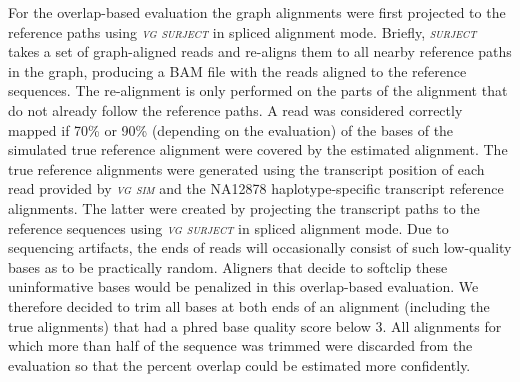 \documentclass[11pt]{ucthesis}
\newcommand{\tool}[1]{\emph{\textsc{#1}}}
\begin{document}
For the overlap-based evaluation the graph alignments were first projected to the reference paths using \tool{vg surject} in spliced alignment mode. Briefly, \tool{surject} takes a set of graph-aligned reads and re-aligns them to all nearby reference paths in the graph, producing a BAM file with the reads aligned to the reference sequences. The re-alignment is only performed on the parts of the alignment that do not already follow the reference paths. A read was considered correctly mapped if 70\% or 90\% (depending on the evaluation) of the bases of the simulated true reference alignment were covered by the estimated alignment. The true reference alignments were generated using the transcript position of each read provided by \tool{vg sim} and the NA12878 haplotype-specific transcript reference alignments. The latter were created by projecting the transcript paths to the reference sequences using \tool{vg surject} in spliced alignment mode. Due to sequencing artifacts, the ends of reads will occasionally consist of such low-quality bases as to be practically random. Aligners that decide to softclip these uninformative bases would be penalized in this overlap-based evaluation. We therefore decided to trim all bases at both ends of an alignment (including the true alignments) that had a phred base quality score below 3. All alignments for which more than half of the sequence was trimmed were discarded from the evaluation so that the percent overlap could be estimated more confidently. 
\end{document}
